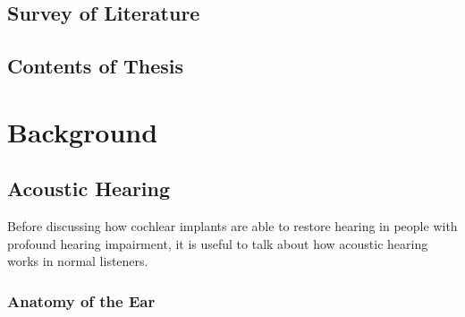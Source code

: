 \documentclass [11pt, proquest] {uwthesis}[2015/03/03]
\begin{document}
\section{Survey of Literature}

\section{Contents of Thesis}


\chapter{Background}

\section{Acoustic Hearing}

Before discussing how cochlear implants are able to restore hearing in people with profound hearing impairment, it is useful to talk about how acoustic hearing works in normal listeners.

\subsection{Anatomy of the Ear}
\end{document}

